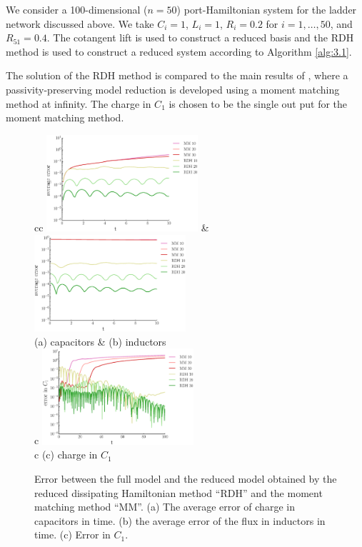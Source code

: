 We consider a 100-dimensional ($n=50$) port-Hamiltonian system for the ladder network discussed above. We take $C_i=1$, $L_i = 1$, $R_i=0.2$ for $i=1,\dots,50$, and $R_{51} = 0.4$. The cotangent lift is used to construct a reduced basis and the RDH method is used to construct a reduced system according to Algorithm \ref{alg:3.1}. 

The solution of the RDH method is compared to the main results of \cite{Polyuga:2010gj}, where a passivity-preserving model reduction is developed using a moment matching method at infinity. The charge in $C_1$ is chosen to be the single out put for the moment matching method.

\begin{figure}[t]
\begin{tabular}{cc}
\includegraphics[width=0.5\textwidth]{./figs/porthamil/error_capac} & 
\includegraphics[width=0.5\textwidth]{./figs/porthamil/error_flux} \\
(a) capacitors & (b) inductors \\
 {c} {\includegraphics[width=0.5\textwidth]{./figs/porthamil/error1}} \\
 {c} {(c) charge in $C_1$} 
\end{tabular}
\caption{Error between the full model and the reduced model obtained by the reduced dissipating Hamiltonian method ``RDH'' and the moment matching method ``MM''. (a) The average error of charge in capacitors in time. (b) the average error of the flux in inductors in time. (c) Error in $C_1$.} \label{fig:4.3}
\end{figure}


